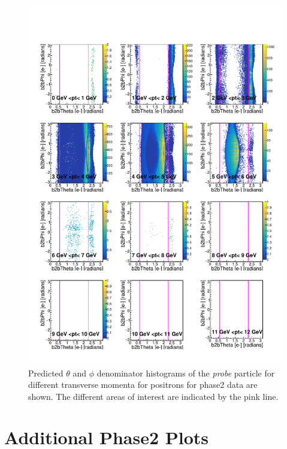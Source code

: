 \documentclass[a4paper,11pt,twosided,final,german,openbib,pdftex,listof=totoc,bibliography=totoc]{scrbook}
\begin{document}
\begin{appendix}
\begin{figure}[h!]
	\includegraphics[width=\textwidth]{Plots/master/RTPtMepE_Data.pdf}
	\caption[Enumerator $\theta$-$\phi$ Positron Transverse Momentum Phase2 Data]{Predicted $\theta$ and $\phi$ denominator histograms of the \textit{probe} particle for different transverse momenta for positrons for phase2 data are shown. The different areas of interest are indicated by the pink line.}
	\label{plt:RTtPMepE_Data}
\end{figure}



\chapter{Additional Phase2 Plots}
\label{A:2}



\end{appendix}
\end{document}

